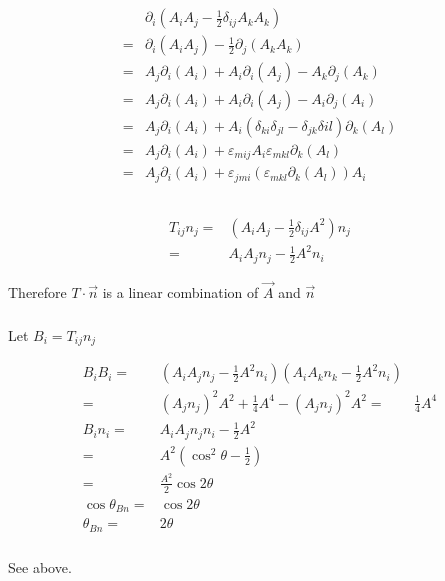 \documentclass[10pt,fleqn]{article}
\newcommand{\eqar}[1]
{
  \begin{align*}
    #1
  \end{align*}
}
\newcommand{\paren}[1]{{\left({#1}\right)}}
\begin{document}
\subsection{}
\eqar{
  &\partial_i\paren{A_iA_j-\frac12\delta_{ij}A_kA_k}\\
  =&\partial_i\paren{A_iA_j}-\frac12\partial_j\paren{A_kA_k}\\
  =&A_j\partial_i\paren{A_i}+A_i\partial_i\paren{A_j}-A_k\partial_j\paren{A_k}\\
  =&A_j\partial_i\paren{A_i}+A_i\partial_i\paren{A_j}-A_i\partial_j\paren{A_i}\\
  =&A_j\partial_i\paren{A_i}+A_i\paren{\delta_{ki}\delta_{jl}-\delta_{jk}\delta{il}}\partial_k\paren{A_l}\\
  =&A_j\partial_i\paren{A_i}+\varepsilon_{mij}A_i\varepsilon_{mkl}\partial_k\paren{A_l}\\
  =&A_j\partial_i\paren{A_i}+\varepsilon_{jmi}\paren{\varepsilon_{mkl}\partial_k\paren{A_l}}A_i
}
\subsection{}
\subsubsection{}
\eqar{
  T_{ij}n_j=&\paren{A_iA_j-\frac12\delta_{ij}A^2}n_j\\
  =&A_iA_jn_j-\frac12A^2n_i
}
Therefore $T\cdot\vec n$ is a linear combination of $\vec A$ and $\vec n$
\subsubsection{}
Let $B_i=T_{ij}n_j$
\eqar{
  B_iB_i=&\paren{A_iA_jn_j-\frac12A^2n_i}\paren{A_iA_kn_k-\frac12A^2n_i}\\
  =&\paren{A_jn_j}^2A^2+\frac14A^4-\paren{A_jn_j}^2A^2
  =&\frac14A^4\\
  B_in_i=&A_iA_jn_jn_i-\frac12A^2\\
  =&A^2\paren{\cos^2\theta-\frac12}\\
  =&\frac{A^2}2\cos2\theta\\
  \cos\theta_{Bn}=&\cos2\theta\\
  \theta_{Bn}=&2\theta
}
\subsubsection{}
See above.
\end{document}
